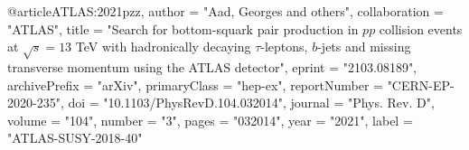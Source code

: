 @article{ATLAS:2021pzz,
    author = "Aad, Georges and others",
    collaboration = "ATLAS",
    title = "{Search for bottom-squark pair production in $pp$ collision events at $\sqrt{s} = 13$ TeV with hadronically decaying $\tau$-leptons, $b$-jets and missing transverse momentum using the ATLAS detector}",
    eprint = "2103.08189",
    archivePrefix = "arXiv",
    primaryClass = "hep-ex",
    reportNumber = "CERN-EP-2020-235",
    doi = "10.1103/PhysRevD.104.032014",
    journal = "Phys. Rev. D",
    volume = "104",
    number = "3",
    pages = "032014",
    year = "2021",
    label = "ATLAS-SUSY-2018-40"
}

